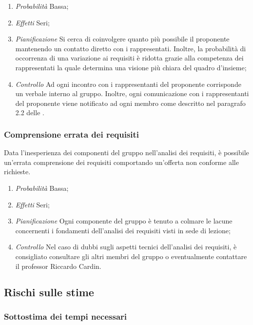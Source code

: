 \begin{enumerate}
\item \textit{Probabilità} Bassa;
\item \textit{Effetti} Seri;
\item \textit{Pianificazione} Si cerca di coinvolgere quanto più possibile il proponente mantenendo un contatto diretto con i rappresentati. Inoltre, la probabilità di occorrenza di una variazione ai requisiti è ridotta grazie alla competenza dei rappresentati la quale determina una visione più chiara del quadro d'insieme;
\item \textit{Controllo} Ad ogni incontro con i rappresentanti del proponente corrisponde un verbale interno al gruppo. Inoltre, ogni comunicazione con i rappresentanti del proponente viene notificato ad ogni membro come descritto nel paragrafo 2.2 delle \NormeDiProgetto.  
\end{enumerate}
		
		\subsubsection{Comprensione errata dei requisiti}

Data l'inesperienza dei componenti del gruppo nell'analisi dei requisiti, è possibile un'errata comprensione dei requisiti comportando un'offerta non conforme alle richieste.

\begin{enumerate}
\item \textit{Probabilità} Bassa;
\item \textit{Effetti} Seri;
\item \textit{Pianificazione} Ogni componente del gruppo è tenuto a colmare le lacune concernenti i fondamenti dell'analisi dei requisiti visti in sede di lezione;
\item \textit{Controllo} Nel caso di dubbi sugli aspetti tecnici dell'analisi dei requisiti, è consigliato consultare gli altri membri del gruppo o eventualmente contattare il professor Riccardo Cardin.
\end{enumerate}

	\subsection{Rischi sulle stime}
	
		\subsubsection{Sottostima dei tempi necessari}

